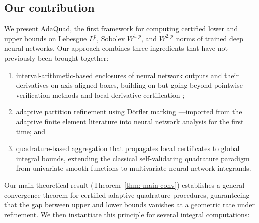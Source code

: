 \documentclass[a4paper, 11pt]{article}
\begin{document}
\subsection{Our contribution}
    We present AdaQuad, the first framework for computing certified lower and upper
bounds on Lebesgue $L^p$, Sobolev $W^{1,p}$, and $W^{2,p}$ norms of trained deep
neural networks. Our approach combines three ingredients that have not previously
been brought together:
%
\begin{enumerate}
  \item interval-arithmetic-based enclosures of neural network outputs and their
    derivatives on axis-aligned boxes, building on but going beyond pointwise
    verification methods \cite{Gowal2018,Zhang2018,Singh2019} and local derivative
    certification \cite{Zhang2019RecurJac,Sharifi2024,Laurel2022};

  \item adaptive partition refinement using D\"{o}rfler marking
    \cite{Dorfler1996}---imported from the adaptive finite element literature into
    neural network analysis for the first time; and

  \item quadrature-based aggregation that propagates local certificates to global
    integral bounds, extending the classical self-validating quadrature paradigm
    \cite{CorlissRall1987} from univariate smooth functions to multivariate neural
    network integrands.
\end{enumerate}
%
Our main theoretical result (Theorem~\ref{thm: main conv}) establishes a general
convergence theorem for certified adaptive quadrature procedures, guaranteeing that
the gap between upper and lower bounds vanishes at a geometric rate under
refinement. We then instantiate this principle for several integral computations:
%
\end{document}

